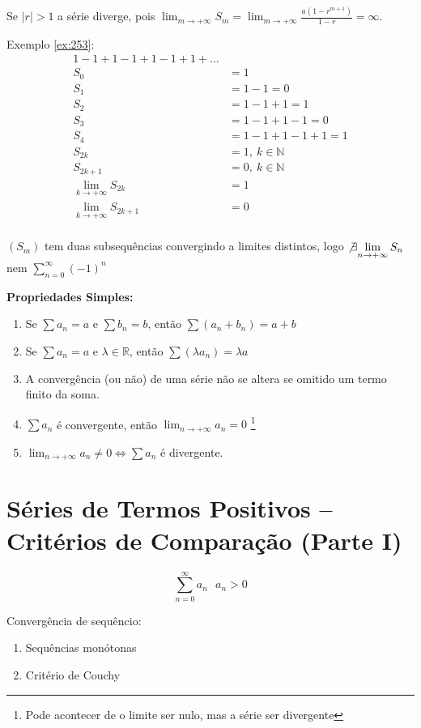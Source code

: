 \documentclass[12pt,openany]{book}
\begin{document}
Se $|r| > 1$ a série diverge, pois $\displaystyle{\lim_{m \rightarrow +\infty} S_m = \lim_{m \rightarrow +\infty} \frac{a(1-r^{m+1})}{1-r} = \infty}$.

Exemplo \ref{ex:253}: 
\begin{align*} 
1 - 1 + 1 - 1 + 1 - 1 + 1 + \hdots \\
S_0 &= 1 \\
S_1 &= 1 - 1 = 0 \\
S_2 &= 1 - 1 + 1 = 1 \\
S_3 &= 1 - 1 + 1  - 1 = 0 \\
S_4 &= 1 - 1 + 1  - 1 + 1 = 1 \\
S_{2k} &= 1, \ k \in \mathds{N} \\
S_{2k+1} &= 0, \ k \in \mathds{N} \\
\lim_{k \rightarrow +\infty} S_{2k} &= 1 \\
\lim_{k \rightarrow +\infty} S_{2k+1} &= 0 \\
\end{align*}

$(S_m)$  tem duas subsequências convergindo a limites distintos, logo $\not \exists \displaystyle{\lim_{n \rightarrow +\infty} S_{n}}$ nem $\displaystyle{\sum_{n=0}^{\infty} (-1)^n}$

\textbf{Propriedades Simples:}
\begin{enumerate}
\item Se $\sum a_n = a$ e $\sum b_n = b$, então $\sum (a_n+b_n) = a+b$
\item Se $\sum a_n = a$ e $\lambda \in \mathds{R}$, então $\sum (\lambda a_n) = \lambda a$
\item A convergência (ou não) de uma série não se altera se omitido um termo finito da soma.
\item $\displaystyle{\sum a_n}$ é convergente, então $\displaystyle{\lim_{n \rightarrow +\infty} a_n = 0}$ \footnote{Pode acontecer de o limite ser nulo, mas a série ser divergente}
\item $\displaystyle{\lim_{n \rightarrow +\infty} a_n \neq 0 \Longleftrightarrow \sum a_n}$ é divergente.
\end{enumerate}

\section{Séries de Termos Positivos -- Critérios de Comparação (Parte I)}
\label{sec:s26}
$$\sum_{n=0}^{\infty} a_n \ \ \ a_n > 0 $$

Convergência de sequêncio:
\begin{enumerate}
\item Sequências monótonas \label{261}
\item Critério de Couchy \label{262}
\end{enumerate}
\end{document}
